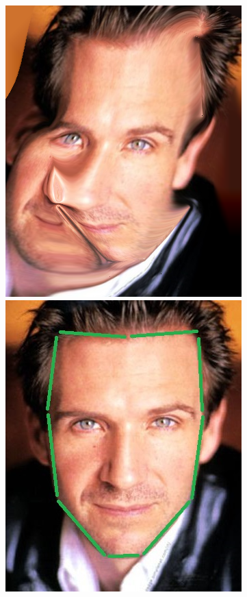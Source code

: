 \documentclass[conference]{IEEEtran}
\begin{document}
\begin{figure}[H]
\begin{multicols}{3}
    \centering
    
    \includegraphics[width=0.65\linewidth]{extra/errors/02/img01.png} \par
    \includegraphics[width=0.65\linewidth]{extra/errors/02/1 lines.jpg} \par 

\end{multicols}
\end{figure}
\end{document}
